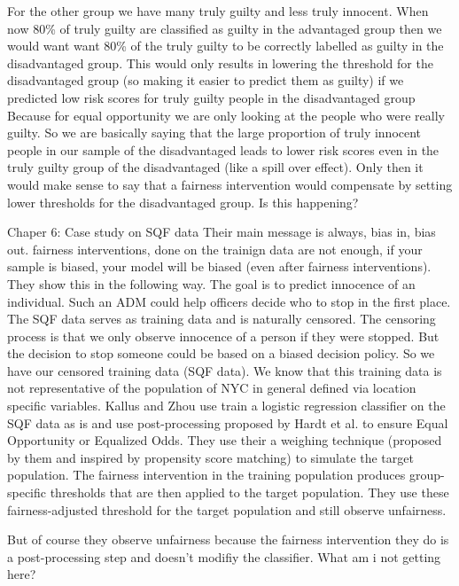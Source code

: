 For the other group we have many truly guilty and less truly innocent. When now 80\% of truly guilty are classified as guilty in the advantaged group then we would want want 80\% of
the truly guilty to be correctly labelled as guilty in the disadvantaged group. This would only results in lowering the threshold for the disadvantaged group
(so making it easier to predict them as guilty) if we predicted low risk scores for truly guilty people in the disadvantaged group
 Because for equal opportunity we are only looking at the people who were really guilty. So we are basically saying that the large proportion of truly
 innocent people in our sample of the disadvantaged leads to lower risk scores even in the truly guilty group of the disadvantaged (like a spill over effect).
 Only then it would make sense to say that a fairness intervention would compensate by setting lower thresholds for the disadvantaged group. Is this happening? 

Chaper 6: Case study on SQF data
Their main message is always, bias in, bias out. fairness interventions, done on the trainign data are not enough, if your sample is biased, your model will be biased (even after fairness interventions).
They show this in the following way. The goal is to predict innocence of an individual. Such an ADM could help officers
decide who to stop in the first place. The SQF data serves as training data and is naturally censored. The censoring process is that we only
observe innocence of a person if they were stopped. But the decision to stop someone could be based on a biased decision policy.
So we have our censored training data (SQF data). We know that this training data is not representative of the population of NYC in general defined via
location specific variables. Kallus and Zhou use train a logistic regression classifier on the SQF data as is and use post-processing proposed
by Hardt et al. to ensure Equal Opportunity or Equalized Odds. They use their a weighing technique (proposed by them and inspired by propensity score matching)
to simulate the target population. The fairness intervention in the training population produces group-specific thresholds that are then applied to the target population.
They use these fairness-adjusted threshold for the target population and still observe unfairness.

But of course they observe unfairness because the fairness intervention they do is a post-processing step and doesn't modifiy the classifier. What am i not getting here?